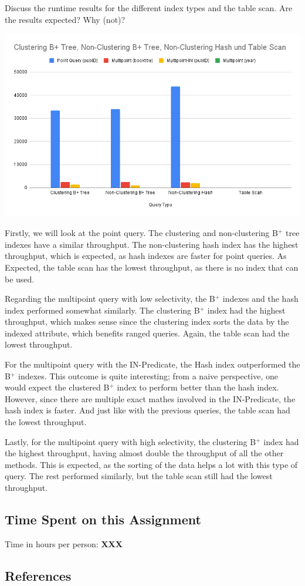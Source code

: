 \documentclass[11pt]{scrartcl}
\begin{document}
Discuss the runtime results for the different index types and the table scan. Are the results expected? Why (not)?

\includegraphics[width=\textwidth]{resources/throughput.png}

Firstly, we will look at the point query.
The clustering and non-clustering B$^+$ tree indexes have a similar throughput.
The non-clustering hash index has the highest throughput, which is expected, as hash indexes are faster for point queries.
As Expected, the table scan has the lowest throughput, as there is no index that can be used.

Regarding the multipoint query with low selectivity, the B$^+$ indexes and the hash index performed somewhat similarly.
The clustering B$^+$ index had the highest throughput, which makes sense since the clustering index sorts the data
by the indexed attribute, which benefits ranged queries.
Again, the table scan had the lowest throughput.

For the multipoint query with the IN-Predicate, the Hash index outperformed the B$^+$ indexes.
This outcome is quite interesting; from a naive perspective, one would expect the clustered B$^+$ index to perform
better than the hash index.
However, since there are multiple exact mathes involved in the IN-Predicate, the hash index is faster.
And just like with the previous queries, the table scan had the lowest throughput.

Lastly, for the multipoint query with high selectivity, the clustering B$^+$ index had the highest throughput, having
almost double the throughput of all the other methods.
This is expected, as the sorting of the data helps a lot with this type of query.
The rest performed similarly, but the table scan still had the lowest throughput.



\subsection*{Time Spent on this Assignment}

Time in hours per person: \textbf{XXX}

\subsection*{References}

\printbibliography
\end{document}

